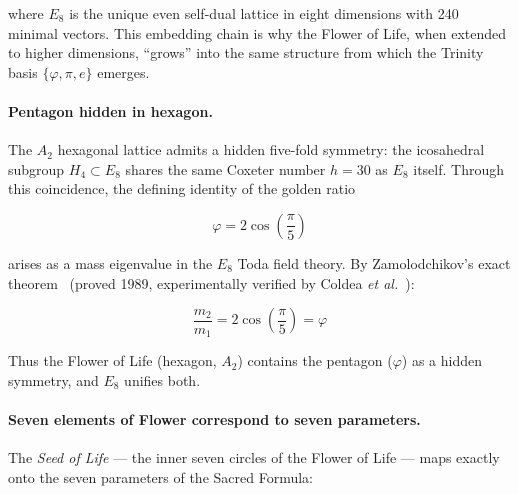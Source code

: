 \documentclass[10pt,a4paper]{article}
\begin{document}
where $E_8$ is the unique even self-dual lattice in eight dimensions with 240 minimal vectors. This embedding chain is why the Flower of Life, when extended to higher dimensions, ``grows'' into the same structure from which the Trinity basis $\{\varphi, \pi, e\}$ emerges.

\paragraph{Pentagon hidden in hexagon.}
The $A_2$ hexagonal lattice admits a hidden five-fold symmetry: the icosahedral subgroup $H_4 \subset E_8$ shares the same Coxeter number $h = 30$ as $E_8$ itself. Through this coincidence, the defining identity of the golden ratio

\begin{equation}
  \varphi = 2\cos\!\left(\frac{\pi}{5}\right)
  \label{eq:phi_pentagon}
\end{equation}

arises as a mass eigenvalue in the $E_8$ Toda field theory. By Zamolodchikov's exact theorem~\cite{zamolodchikov1989} (proved 1989, experimentally verified by Coldea \textit{et al.}~\cite{coldea2010}):

\begin{equation}
  \frac{m_2}{m_1} = 2\cos\!\left(\frac{\pi}{5}\right) = \varphi
  \label{eq:zamolodchikov_phi}
\end{equation}

Thus the Flower of Life (hexagon, $A_2$) contains the pentagon ($\varphi$) as a hidden symmetry, and $E_8$ unifies both.

\paragraph{Seven elements of Flower correspond to seven parameters.}
The \emph{Seed of Life} --- the inner seven circles of the Flower of Life --- maps exactly onto the seven parameters of the Sacred Formula:
\end{document}
